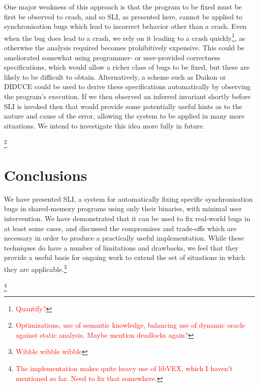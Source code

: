 \documentclass[10pt,twocolumn,preprint,natbib,authoryear]{sigplanconf}
\newcommand{\editorial}[1]{\textcolor{red}{\footnote{\textcolor{red}{#1}}}}
\begin{document}
One major weakness of this approach is that the program to be fixed
must be first be observed to crash, and so SLI, as presented here,
cannot be applied to synchronisation bugs which lead to incorrect
behavior other than a crash.  Even when the bug does lead to a crash,
we rely on it leading to a crash quickly\editorial{Quantify?}, as
otherwise the analysis required becomes prohibitively expensive.  This
could be ameliorated somewhat using programmer- or user-provided
correctness specifications, which would allow a richer class of bugs
to be fixed, but these are likely to be difficult to obtain.
Alternatively, a scheme such as Daikon\cite{Ernst2007} or
DIDUCE\cite{Hangal2002} could be used to derive these specifications
automatically by observing the program's execution.  If we then
observed an inferred invariant shortly before SLI is invoked then that
would provide some potentially useful hints as to the nature and cause
of the error, allowing the system to be applied in many more
situations.  We intend to investigate this idea more fully in future.

\editorial{Optimizations, use of semantic knowledge, balancing use of
  dynamic oracle against static analysis.  Maybe mention deadlocks
  again?}

\section{Conclusions}

We have presented SLI, a system for automatically fixing specific
synchronisation bugs in shared-memory programs using only their
binaries, with minimal user intervention.  We have demonstrated that
it can be used to fix real-world bugs in at least some cases, and
discussed the compromises and trade-offs which are necessary in order
to produce a practically useful implementation.  While these
techniques do have a number of limitations and drawbacks, we feel that
they provide a useful basis for ongoing work to extend the set of
situations in which they are applicable.\editorial{Wibble wibble
  wibble}

\acks

\editorial{The implementation makes quite heavy use of libVEX, which I
  haven't mentioned so far.  Need to fix that somewhere.}




\end{document}

